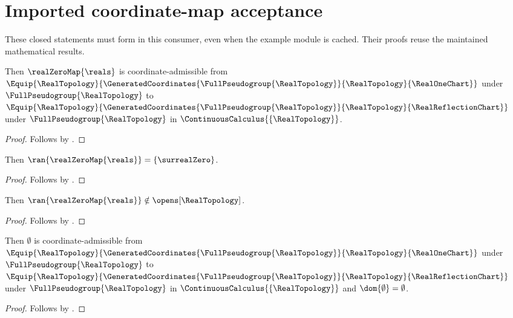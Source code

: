 \section{Imported coordinate-map acceptance}




These closed statements must form in this consumer, even when the example
module is cached. Their proofs reuse the maintained mathematical results.

\begin{theorem}\label{imported_real_zero_coordinate_map}
    Then $\realZeroMap{\reals}$ is coordinate-admissible
        from $\Equip{\RealTopology}{\GeneratedCoordinates{\FullPseudogroup{\RealTopology}}{\RealTopology}{\RealOneChart}}$
        under $\FullPseudogroup{\RealTopology}$
        to $\Equip{\RealTopology}{\GeneratedCoordinates{\FullPseudogroup{\RealTopology}}{\RealTopology}{\RealReflectionChart}}$
        under $\FullPseudogroup{\RealTopology}$ in $\ContinuousCalculus{\{\RealTopology\}}$.
\end{theorem}
\begin{proof}
    Follows by .
\end{proof}

\begin{theorem}\label{imported_real_zero_map_image}
    Then $\ran{\realZeroMap{\reals}}=\{\surrealZero\}$.
\end{theorem}
\begin{proof}
    Follows by .
\end{proof}

\begin{theorem}\label{imported_real_zero_map_image_not_open}
    Then $\ran{\realZeroMap{\reals}}\notin\opens[\RealTopology]$.
\end{theorem}
\begin{proof}
    Follows by .
\end{proof}

\begin{theorem}\label{imported_real_empty_coordinate_map}
    Then $\emptyset$ is coordinate-admissible
        from $\Equip{\RealTopology}{\GeneratedCoordinates{\FullPseudogroup{\RealTopology}}{\RealTopology}{\RealOneChart}}$
        under $\FullPseudogroup{\RealTopology}$
        to $\Equip{\RealTopology}{\GeneratedCoordinates{\FullPseudogroup{\RealTopology}}{\RealTopology}{\RealReflectionChart}}$
        under $\FullPseudogroup{\RealTopology}$ in $\ContinuousCalculus{\{\RealTopology\}}$
        and $\dom{\emptyset}=\emptyset$.
\end{theorem}
\begin{proof}
    Follows by .
\end{proof}

